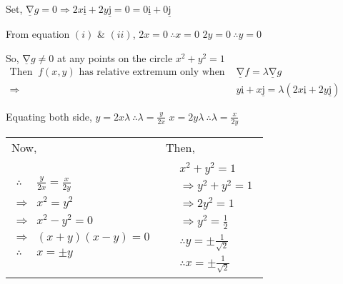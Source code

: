 \documentclass[12pt]{article}
\renewcommand{\vec}[1]{\underline{\mathrm{#1}}}
\begin{document}
\vspace{-0.5\baselineskip}
\begin{minipage}[t]{0.64\linewidth}
\noindent
   \begin{adjustbox}{valign=t}
      Set, $\vec{\nabla} g=0 \Rightarrow 2 x \vec{i}+2 y \vec{j}=0=0 \vec{i}+0 \vec{j}$
   \end{adjustbox}

   \vspace{2ex}
   From equation $(i)$ \& $(ii)$,\quad
   $2x=0 \ \therefore x=0$ \quad \quad
   $2y=0 \ \therefore y=0$

   So, $\vec{\nabla} g \neq 0$ at any points on the circle $x^2+y^2=1$\\

   $\begin{aligned}
      \text{Then }\ f(x, y) \text{ has relative extremum only when }
      & \vec{\nabla} f =\lambda \vec{\nabla}g\\
      \Rightarrow & y \vec{i}+x \vec{j} = 
      \lambda(2 x \vec{i}+2 y \vec{j})
   \end{aligned}$

Equating both side,
$y=2x\lambda \ \therefore \lambda=\frac{y}{2 x}$
\quad {} \quad
$x=2y\lambda \ \therefore \lambda=\frac{x}{2y}$
\end{minipage}\hspace{0.5ex}
\begin{minipage}[t]{0.341\linewidth}
\noindent
   \begin{adjustbox}{valign=t}
      \begin{tabular}{l|l}
         Now, & Then,\\
         $\begin{aligned}
         \therefore & \frac{y}{2 x}=\frac{x}{2 y} \\
         \Rightarrow & x^2=y^2 \\
         \Rightarrow & x^2-y^2=0 \\
         \Rightarrow & (x+y)(x-y)=0 \\
         \therefore \ & x= \pm y
         \end{aligned}$
         &
         $\begin{aligned}
         & x^2+y^2=1 \\
         & \Rightarrow y^2+y^2=1 \\
         & \Rightarrow 2 y^2=1 \\
         & \Rightarrow y^2=\frac{1}{2}\\
         & \therefore y= \pm \frac{1}{\sqrt{2}} \\
         & \therefore x= \pm \frac{1}{\sqrt{2}} 
         \end{aligned}$
         \end{tabular}
   \end{adjustbox}
\end{minipage}
\end{document}
